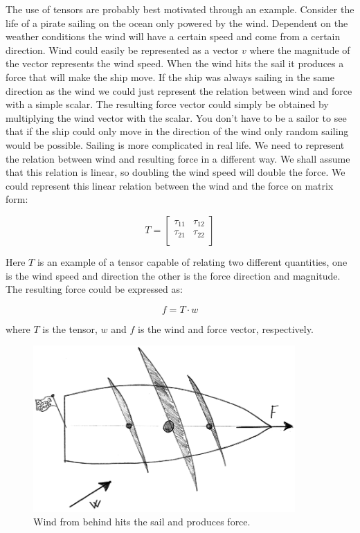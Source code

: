 
The use of tensors are probably best motivated through an
example. Consider the life of a pirate sailing on the ocean only
powered by the wind.
Dependent on the weather conditions the wind
will have a certain speed and come from a certain direction. Wind could easily
be represented as a vector $v$ where the magnitude of the vector
represents the wind speed. When the wind hits the sail it produces a
force that will make the ship move. If the ship was always sailing in the
same direction as the wind we could just represent the relation between
wind and force with a simple scalar. The resulting
force vector could simply be obtained by multiplying the wind vector with the
scalar. You don't have to be a sailor to see that if the ship
could only move in the direction of the wind only random sailing would
be possible. Sailing is more complicated in real life. We need to
represent the relation between wind and resulting force in a different
way. We shall assume that this relation is linear, so doubling the
wind speed will double the force. We could represent this linear relation
between the wind and the force on matrix form:

\begin{equation}
T = 
\begin{bmatrix} 
\tau_{11} & \tau_{12} \\
\tau_{21} & \tau_{22} \\
\end{bmatrix} 
\end{equation}

Here $T$ is an example of a tensor capable of relating two different quantities,
one is the wind speed and direction the other is the force direction
and magnitude. The resulting force could be expressed as:

\begin{equation}
f = T \cdot w
\end{equation}

where $T$ is the tensor, $w$ and $f$ is the wind and
force vector, respectively.

\begin{figure}
  \centering
  \includegraphics[width=10cm]{./images/mathematics_tensor_pirate_ship.png}
\caption{Wind from behind hits the sail and produces force.}
\label{fig:tensor_pirate_ship}
\end{figure}

